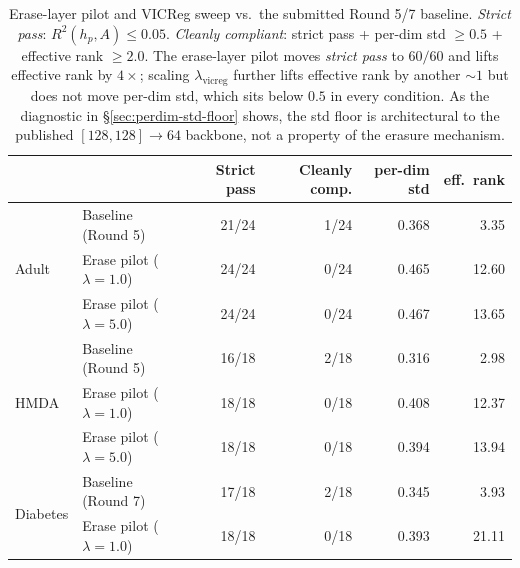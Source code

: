\begin{table}[t]
\centering
\small
\caption{Erase-layer pilot and VICReg sweep vs.\ the submitted Round 5/7
baseline. \textit{Strict pass}: $R^2(h_p, A) \leq 0.05$. \textit{Cleanly
compliant}: strict pass + per-dim std $\geq 0.5$ + effective rank $\geq 2.0$.
The erase-layer pilot moves \textit{strict pass} to $60/60$ and lifts
effective rank by $4\times$; scaling $\lambda_{\text{vicreg}}$ further
lifts effective rank by another $\sim 1$ but does not move per-dim std,
which sits below $0.5$ in every condition. As the diagnostic in
\S\ref{sec:perdim-std-floor} shows, the std floor is architectural to
the published $[128,128] \to 64$ backbone, not a property of the
erasure mechanism.}
\label{tab:erase_vicreg_sweep}
\begin{tabular}{l l r r r r}
\toprule
 & & Strict pass & Cleanly comp. & per-dim std & eff.\ rank \\
\midrule
\multirow{3}{*}{Adult}
  & Baseline (Round 5)        & 21/24 & 1/24 & 0.368 & 3.35 \\
  & Erase pilot ($\lambda{=}1.0$)  & 24/24 & 0/24 & 0.465 & 12.60 \\
  & Erase pilot ($\lambda{=}5.0$)  & 24/24 & 0/24 & 0.467 & 13.65 \\
\midrule
\multirow{3}{*}{HMDA}
  & Baseline (Round 5)        & 16/18 & 2/18 & 0.316 & 2.98 \\
  & Erase pilot ($\lambda{=}1.0$)  & 18/18 & 0/18 & 0.408 & 12.37 \\
  & Erase pilot ($\lambda{=}5.0$)  & 18/18 & 0/18 & 0.394 & 13.94 \\
\midrule
\multirow{3}{*}{Diabetes}
  & Baseline (Round 7)        & 17/18 & 2/18 & 0.345 & 3.93 \\
  & Erase pilot ($\lambda{=}1.0$)  & 18/18 & 0/18 & 0.393 & 21.11 \\

\end{tabular}
\end{table}
